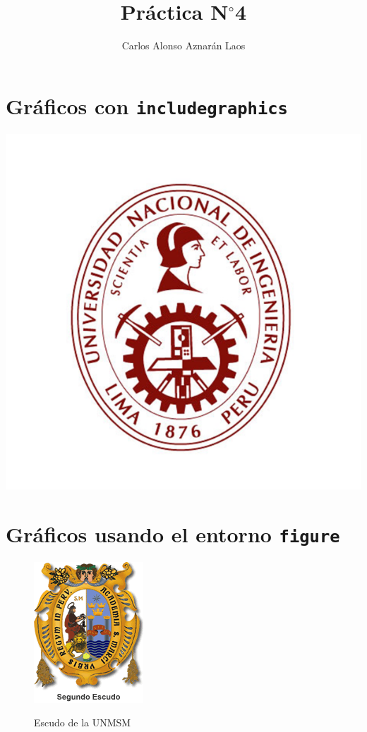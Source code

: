 \documentclass[12pt,a4paper]{article}
\author{Carlos Alonso Aznarán Laos}
\title{Práctica N$^{\circ}$4}
\begin{document}
\maketitle

\section{Gráficos con \texttt{includegraphics}}

\includegraphics[scale=0.5]{logo_unii}

\section{Gráficos usando el entorno \texttt{figure}}

\begin{figure}[h]
\centering
\hspace{4.5cm}
\includegraphics[scale=1]{escud_mati}
\label{UNI}
\vspace{-1cm}
\caption{Escudo de la UNMSM}
		
\end{figure}
\end{document}
